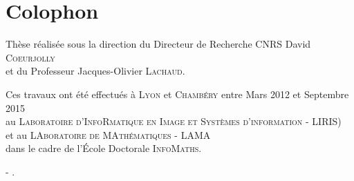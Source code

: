 %
\pagestyle{empty}
\hfill
\vfill
{}
\section*{Colophon}

Thèse réalisée sous la direction du Directeur de Recherche CNRS David \textsc{Coeurjolly}\\
et du Professeur Jacques-Olivier \textsc{Lachaud}.

Ces travaux ont été effectués à \textsc{Lyon} et \textsc{Chambéry} entre Mars 2012 et Septembre 2015\\
au \textsc{Laboratoire d'InfoRmatique en Image et Systèmes d'information - LIRIS})\\%
et au \textsc{LAboratoire de MAthématiques - LAMA}\\
dans le cadre de l'École Doctorale \textsc{InfoMaths}.


\sayMyName - \emph{\thesisTitle}.
